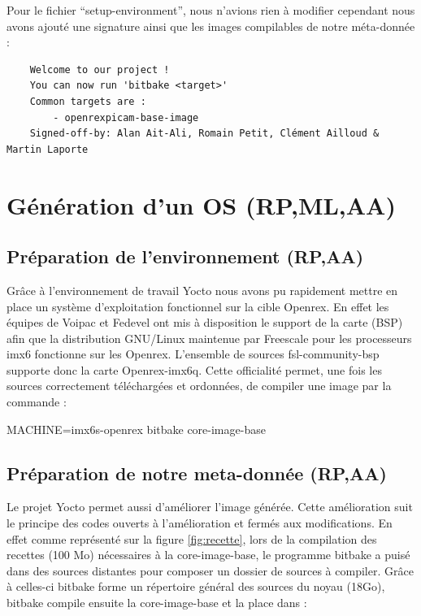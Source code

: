 Pour le fichier “setup-environment”, nous n’avions rien à modifier cependant nous avons
ajouté une signature ainsi que les images compilables de notre méta-donnée :

\begin{lstlisting}
    Welcome to our project !
    You can now run 'bitbake <target>'
    Common targets are :
        - openrexpicam-base-image
    Signed-off-by: Alan Ait-Ali, Romain Petit, Clément Ailloud & Martin Laporte
\end{lstlisting}

\section{Génération d'un OS (RP,ML,AA)}

\subsection{Préparation de l'environnement (RP,AA)}

Grâce à l’environnement de travail Yocto nous avons pu rapidement mettre en place un
système d’exploitation fonctionnel sur la cible Openrex. En effet les équipes de Voipac et
Fedevel ont mis à disposition le support de la carte (BSP) afin que la distribution
GNU/Linux maintenue par Freescale pour les processeurs imx6 fonctionne sur les
Openrex. L’ensemble de sources fsl-community-bsp supporte donc la carte
Openrex-imx6q. Cette officialité permet, une fois les sources correctement téléchargées et
ordonnées, de compiler une image par la commande :

\begin{tcolorbox}
    MACHINE=imx6s-openrex bitbake core-image-base
\end{tcolorbox}

\subsection{Préparation de notre meta-donnée (RP,AA)}

Le projet Yocto permet aussi d’améliorer l’image générée. Cette amélioration suit le principe des
codes ouverts à l’amélioration et fermés aux modifications. En effet comme représenté sur la
figure \ref{fig:recette}, lors de la compilation des recettes (100 Mo) nécessaires à la core-image-base, le
programme bitbake a puisé dans des sources distantes pour composer un dossier de sources à compiler. 
Grâce à celles-ci bitbake forme un répertoire général des sources du noyau (18Go), bitbake compile 
ensuite la core-image-base et la place dans :  \medskip

